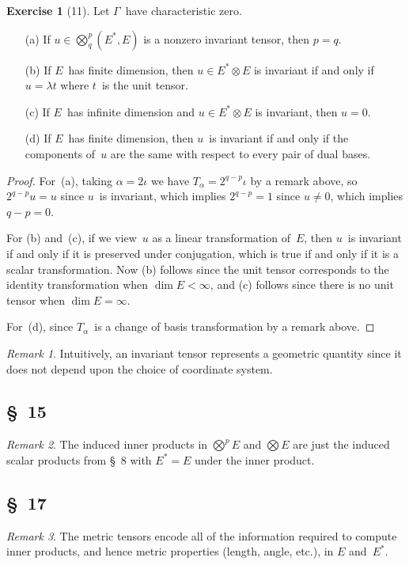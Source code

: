 \documentclass[letterpaper,12pt]{article}
\newcommand{\tprod}{\otimes}
\newcommand{\bigtprod}{\bigotimes}
\newcommand{\medtprod}{{\textstyle\bigtprod}}
\theoremstyle{definition}
\newtheorem*{exer}{Exercise}
\theoremstyle{remark}
\newtheorem*{rmk}{Remark}
\begin{document}
\begin{exer}[11]
Let \(\Gamma\)~have characteristic zero.
\begin{enumerate}
\item[(a)] If \(u\in\medtprod^p_q(E^*,E)\) is a nonzero invariant tensor, then \(p=q\).
\item[(b)] If \(E\)~has finite dimension, then \(u\in E^*\tprod E\) is invariant if and only if \(u=\lambda t\) where \(t\)~is the unit tensor.
\item[(c)] If \(E\)~has infinite dimension and \(u\in E^*\tprod E\) is invariant, then \(u=0\).
\item[(d)] If \(E\)~has finite dimension, then \(u\)~is invariant if and only if the components of~\(u\) are the same with respect to every pair of dual bases.
\end{enumerate}
\end{exer}
\begin{proof}
For~(a), taking \(\alpha=2\iota\) we have \(T_{\alpha}=2^{q-p}\iota\) by a remark above, so \(2^{q-p}u=u\) since \(u\)~is invariant, which implies \(2^{q-p}=1\) since \(u\ne 0\), which implies \(q-p=0\).

For (b) and~(c), if we view~\(u\) as a linear transformation of~\(E\), then \(u\)~is invariant if and only if it is preserved under conjugation, which is true if and only if it is a scalar transformation. Now (b) follows since the unit tensor corresponds to the identity transformation when \(\dim E<\infty\), and (c) follows since there is no unit tensor when \(\dim E=\infty\).

For~(d), since \(T_{\alpha}\)~is a change of basis transformation by a remark above.
\end{proof}
\begin{rmk}
Intuitively, an invariant tensor represents a geometric quantity since it does not depend upon the choice of coordinate system.
\end{rmk}

\subsection*{\S~15}
\begin{rmk}
The induced inner products in \(\medtprod^p E\) and \(\medtprod E\) are just the induced scalar products from \S~8 with \(E^*=E\) under the inner product.
\end{rmk}

\subsection*{\S~17}
\begin{rmk}
The metric tensors encode all of the information required to compute inner products, and hence metric properties (length, angle, etc.), in \(E\) and~\(E^*\).
\end{rmk}
\end{document}
